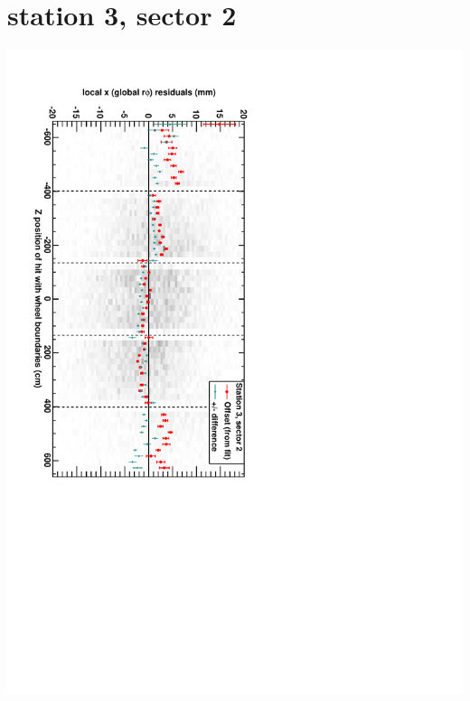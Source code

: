 \documentclass[compress]{beamer}
\begin{document}
\section*{station 3, sector 2}
\begin{frame} \vfill \mbox{\hspace{-1 cm}\includegraphics[height=1.2\linewidth, angle=90]{DTrphiVsZ_st3_sr02.pdf}} \end{frame}
\end{document}
